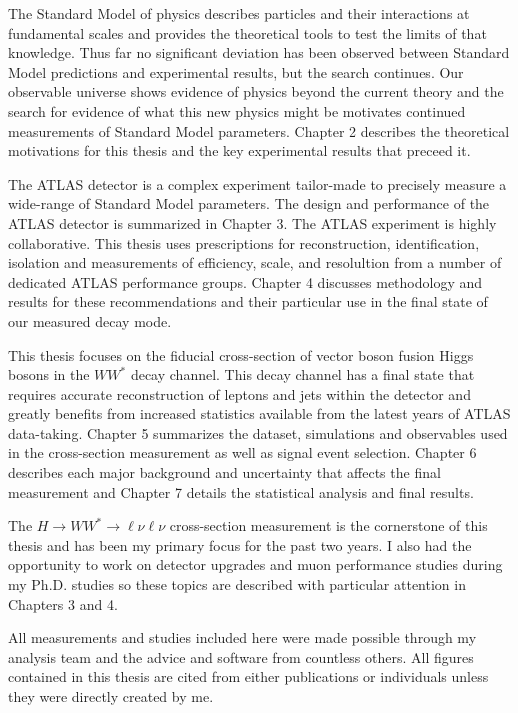 The Standard Model of physics describes particles and their interactions at fundamental scales and provides the theoretical tools to test the limits of that knowledge. Thus far no significant deviation has been observed between Standard Model predictions and experimental results, but the search continues. Our observable universe shows evidence of physics beyond the current theory and the search for evidence of what this new physics might be motivates continued measurements of Standard Model parameters. Chapter 2 describes the theoretical motivations for this thesis and the key experimental results that preceed it. 
 
The ATLAS detector is a complex experiment tailor-made to precisely measure a wide-range of Standard Model parameters. The design and performance of the ATLAS detector is summarized in Chapter 3. The ATLAS experiment is highly collaborative. This thesis uses prescriptions for reconstruction, identification, isolation and measurements of efficiency, scale, and resolultion from a number of dedicated ATLAS performance groups. Chapter 4 discusses methodology and results for these recommendations and their particular use in the final state of our measured decay mode. 

 This thesis focuses on the fiducial cross-section of vector boson fusion Higgs bosons in the $WW^*$ decay channel. This decay channel has a final state that requires accurate reconstruction of leptons and jets within the detector and greatly benefits from increased statistics available from the latest years of ATLAS data-taking. Chapter 5 summarizes the dataset, simulations and observables used in the cross-section measurement as well as signal event selection. Chapter 6 describes each major background and uncertainty that affects the final measurement and Chapter 7 details the statistical analysis and final results.  

The $H\rightarrow WW^*\rightarrow \ell\nu\ell\nu$ cross-section measurement is the cornerstone of this thesis and has been my primary focus for the past two years. I also had the opportunity to work on detector upgrades and muon performance studies during my Ph.D. studies so these topics are described with particular attention in Chapters 3 and 4. 

All measurements and studies included here were made possible through my analysis team and the advice and software from countless others. All figures contained in this thesis are cited from either publications or individuals unless they were directly created by me.

